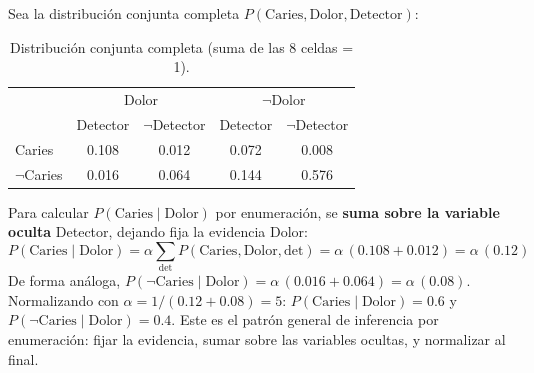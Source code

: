 \begin{example}
    Sea la distribución conjunta completa $P(\text{Caries}, \text{Dolor}, \text{Detector})$:
    \begin{table}[H]
        \centering
        \begin{tabular}{lcccc}
            \toprule
             & \multicolumn{2}{c}{Dolor} & \multicolumn{2}{c}{$\neg$Dolor} \\
             & Detector & $\neg$Detector & Detector & $\neg$Detector \\
            \midrule
            Caries      & 0.108 & 0.012 & 0.072 & 0.008 \\
            $\neg$Caries & 0.016 & 0.064 & 0.144 & 0.576 \\
            \bottomrule
        \end{tabular}
        \caption{Distribución conjunta completa (suma de las 8 celdas = 1).}
    \end{table}
    Para calcular $P(\text{Caries} \mid \text{Dolor})$ por enumeración, se \textbf{suma sobre la variable oculta}
    Detector, dejando fija la evidencia Dolor:
    \[
        P(\text{Caries} \mid \text{Dolor}) = \alpha \sum_{\text{det}} P(\text{Caries}, \text{Dolor}, \text{det})
        = \alpha \, (0.108 + 0.012) = \alpha \, (0.12)
    \]
    De forma análoga, $P(\neg\text{Caries} \mid \text{Dolor}) = \alpha\,(0.016+0.064) = \alpha\,(0.08)$. Normalizando
    con $\alpha = 1/(0.12+0.08) = 5$: $P(\text{Caries}\mid\text{Dolor}) = 0.6$ y $P(\neg\text{Caries}\mid\text{Dolor}) =
    0.4$. Este es el patrón general de inferencia por enumeración: fijar la evidencia, sumar sobre las variables
    ocultas, y normalizar al final.
\end{example}

